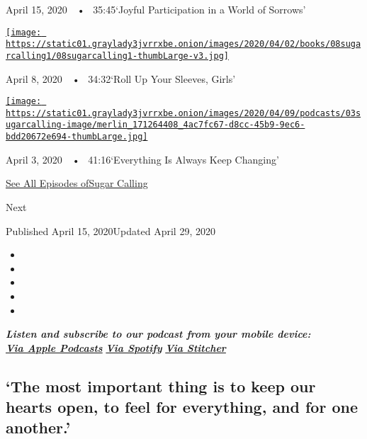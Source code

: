 April 15, 2020~~•~ 35:45`Joyful Participation in a World of Sorrows'

\href{https://www.nytimes3xbfgragh.onion/2020/04/08/podcasts/sugar-calling-margaret-atwood-coronavirus.html?action=click\&module=audio-series-bar\&region=header\&pgtype=Article}{\texttt{[image: https://static01.graylady3jvrrxbe.onion/images/2020/04/02/books/08sugarcalling1/08sugarcalling1-thumbLarge-v3.jpg]}}

April 8, 2020~~•~ 34:32`Roll Up Your Sleeves, Girls'

\href{https://www.nytimes3xbfgragh.onion/2020/04/03/podcasts/sugar-calling-george-saunders-coronavirus.html?action=click\&module=audio-series-bar\&region=header\&pgtype=Article}{\texttt{[image: https://static01.graylady3jvrrxbe.onion/images/2020/04/09/podcasts/03sugarcalling-image/merlin\_171264408\_4ac7fc67-d8cc-45b9-9ec6-bdd20672e694-thumbLarge.jpg]}}

April 3, 2020~~•~ 41:16`Everything Is Always Keep Changing'

\href{https://www.nytimes3xbfgragh.onion/column/sugar-calling}{See All
Episodes ofSugar Calling}

Next

Published April 15, 2020Updated April 29, 2020

\begin{itemize}
\item
\item
\item
\item
\item
\end{itemize}

\emph{\textbf{Listen and subscribe to our podcast from your mobile
device:}}\\
\textbf{\href{https://podcasts.apple.com/us/podcast/sugar-calling/id1505881384}{\emph{Via
Apple Podcasts}}} \emph{\textbf{\textbar{}}}
\textbf{\href{https://open.spotify.com/show/4U8hPiNGIBvTS9zLeiDCN7?si=gRyigD47SPWl-QWgNjgt2w}{\emph{Via
Spotify}}} \emph{\textbf{\textbar{}}}
\textbf{\href{https://www.stitcher.com/podcast/the-new-york-times/sugar-calling}{\emph{Via
Stitcher}}}

\hypertarget{the-most-important-thing-is-to-keep-our-hearts-open-to-feel-for-everything-and-for-one-another}{%
\subsection{`The most important thing is to keep our hearts open, to
feel for everything, and for one
another.'}\label{the-most-important-thing-is-to-keep-our-hearts-open-to-feel-for-everything-and-for-one-another}}

